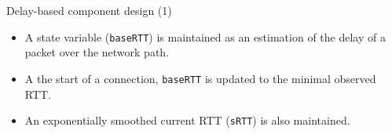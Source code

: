 \begin{frame}{Delay-based component design (1)}
        \begin{itemize}
		\item A state variable (\texttt{baseRTT}) is maintained as
		      an estimation of the delay of a packet over the
		      network path.
		\item A the start of a connection, \texttt{baseRTT} is updated
		      to the minimal observed RTT.
		\item An exponentially smoothed current RTT (\texttt{sRTT}) is also maintained.
        \end{itemize}
\end{frame}

